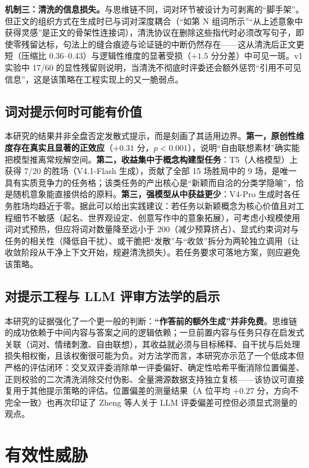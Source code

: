 \textbf{机制三：清洗的信息损失。}与思维链不同，词对环节被设计为可剥离的“脚手架”。但正文的组织方式在生成时已与词对深度耦合（“如第 N 组词所示”“从上述意象中获得灵感”是正文的骨架性连接词），清洗协议在删除这些指代时必须改写句子，即使零残留达标，句法上的缝合痕迹与论证链的中断仍然存在——这从清洗后正文更短（压缩比 0.36--0.43）与逻辑性维度的显著受损（$+1.5$ 分分差）中可见一斑。v1 实验中 17/60 的显性残留则说明，当清洗不彻底时评委还会额外惩罚“引用不可见信息”，这是该策略在工程实现上的又一脆弱点。

\subsection{词对提示何时可能有价值}

本研究的结果并非全盘否定发散式提示，而是刻画了其适用边界。\textbf{第一，原创性维度存在真实且显著的正效应}（$+0.31$ 分，$p<0.001$），说明“自由联想素材”确实能把模型推离常规解空间。\textbf{第二，收益集中于概念构建型任务}：T5（人格模型）上 \wordpairs{} 获得 7/20 的胜场（V4.1-Flash 生成），贡献了全部 15 场胜局中的 9 场，是唯一具有实质竞争力的任务格；该类任务的产出核心是“新颖而自洽的分类学隐喻”，恰是随机意象能直接供给的原料。\textbf{第三，强模型从中获益更少}：V4-Pro 生成时各任务胜场均趋近于零。据此可以给出实践建议：若任务以新颖概念为核心价值且对工程细节不敏感（起名、世界观设定、创意写作中的意象拓展），可考虑小规模使用词对式预热，但应将词对数量降至远小于 200（减少预算挤占）、显式约束词对与任务的相关性（降低自干扰）、或干脆把“发散”与“收敛”拆分为两轮独立调用（让收敛阶段从干净上下文开始，规避清洗损失）。若任务要求可落地方案，则应避免该策略。

\subsection{对提示工程与 LLM 评审方法学的启示}

本研究的证据强化了一个更一般的判断：\textbf{“作答前的额外生成”并非免费}。思维链的成功依赖于中间内容与答案之间的逻辑依赖；一旦前置内容与任务只存在启发式关联（词对、情绪刺激\cite{li2023emotion}、自由联想），其收益就必须与目标稀释、自干扰与后处理损失相权衡，且该权衡很可能为负。对方法学而言，本研究亦示范了一个低成本但严格的评估闭环：交叉双评委消除单一评委偏好、确定性哈希平衡消除位置偏差、正则校验的二次清洗消除交付伪影、全量溯源数据支持独立复核——该协议可直接复用于其他提示策略的评估。位置偏差的测量结果（A 位平均 $+0.27$ 分，方向不完全一致）也再次印证了 Zheng 等人关于 LLM 评委偏差可控但必须显式测量的观点\cite{zheng2023judging,shi2025position}。

\section{有效性威胁}\label{sec:threats}

